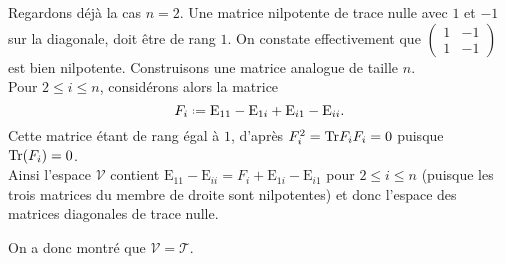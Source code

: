 \begin{solution}
\begin{itemize}
        Regardons déjà la cas $n = 2$. Une matrice nilpotente de trace nulle avec $1$ et $-1$ sur la diagonale, doit être de rang $1$. On constate effectivement que $\begin{pmatrix} 1 & -1 \\ 1 & -1 \end{pmatrix}$ est bien nilpotente. Construisons une matrice analogue de taille $n$. \\
        Pour $2 \leqslant i \leqslant n$, considérons alors la matrice
        $$F_i \defeq \mathrm{E}_{11} - \mathrm{E}_{1i} + \mathrm{E}_{i1} - \mathrm{E}_{ii}.$$
        Cette matrice étant de rang égal à $1$, d'après  $F_i^2 = \mathrm{Tr}{F_i} F_i = 0$ puisque $\mathrm{Tr}(F_i) = 0$. \\
        Ainsi l'espace $\mathcal{V}$ contient $\mathrm{E}_{11}-\mathrm{E}_{ii} = F_i + \mathrm{E}_{1i} - \mathrm{E}_{i1}$ pour $2 \leqslant i \leqslant n$ (puisque les trois matrices du membre de droite sont nilpotentes) et donc l'espace des matrices diagonales de trace nulle. 
    \end{itemize}
    On a donc montré que $\mathcal{V} = \mathcal{T}$.
\end{solution}

